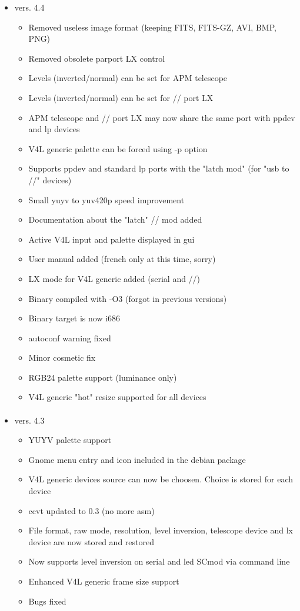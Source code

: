 \documentclass[11pt,a4paper]{book}
\begin{document}
\begin{itemize}
\begin{itemize}
\end{itemize}
\item vers. 4.4
\begin{itemize}
\item Removed useless image format (keeping FITS, FITS-GZ, AVI, BMP, PNG)
\item Removed obsolete parport LX control
\item Levels (inverted/normal) can be set for APM telescope
\item Levels (inverted/normal) can be set for // port LX
\item APM telescope and // port LX may now share the same port with ppdev and lp devices
\item V4L generic palette can be forced using -p option
\item Supports ppdev and standard lp ports with the "latch mod" (for "usb to //" devices)
\item Small yuyv to yuv420p speed improvement
\item Documentation about the "latch" // mod added
\item Active V4L input and palette displayed in gui
\item User manual added (french only at this time, sorry)
\item LX mode for V4L generic added (serial and //)
\item Binary compiled with -O3 (forgot in previous versions)
\item Binary target is now i686
\item autoconf warning fixed
\item Minor cosmetic fix
\item RGB24 palette support (luminance only)
\item V4L generic "hot" resize supported for all devices
\end{itemize}
\paragraph*{}
\item vers. 4.3
\begin{itemize}
\item YUYV palette support
\item Gnome menu entry and icon included in the debian package
\item V4L generic devices source can now be choosen. Choice is stored for each device
\item ccvt updated to 0.3 (no more asm)
\item File format, raw mode, resolution, level inversion, telescope device and lx device 
 are now stored and restored
\item Now supports level inversion on serial and led SCmod via command line
\item Enhanced V4L generic frame size support
\item Bugs fixed
\end{itemize}

\end{itemize}
\end{document}
